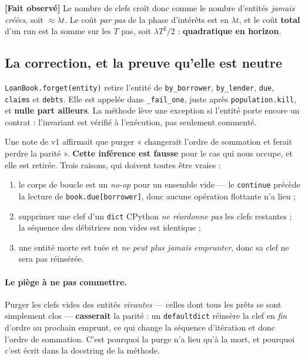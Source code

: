 \documentclass[11pt,a4paper]{article}
\newcommand{\code}[1]{\texttt{#1}}
\newcommand{\fait}{\textbf{[Fait observé]}}
\begin{document}
\fait{} Le nombre de clefs croît donc comme le nombre d'entités \emph{jamais
créées}, soit $\approx \lambda t$. Le coût \emph{par pas} de la phase
d'intérêts est en $\lambda t$, et le coût \textbf{total} d'un run est la somme
sur les $T$ pas, soit $\lambda T^2/2$ : \textbf{quadratique en horizon}.

\subsection{La correction, et la preuve qu'elle est neutre}

\code{LoanBook.forget(entity)} retire l'entité de \code{by\_borrower},
\code{by\_lender}, \code{due}, \code{claims} et \code{debts}. Elle est appelée
dans \code{\_fail\_one}, juste après \code{population.kill}, et \textbf{nulle
part ailleurs}. La méthode lève une exception si l'entité porte encore un
contrat : l'invariant est vérifié à l'exécution, pas seulement commenté.

Une note de v1 affirmait que purger « changerait l'ordre de sommation et ferait
perdre la parité ». \textbf{Cette inférence est fausse} pour le cas qui nous
occupe, et elle est retirée. Trois raisons, qui doivent toutes être vraies :

\begin{enumerate}
\item le corps de boucle est un \emph{no-op} pour un ensemble vide --- le
  \code{continue} précède la lecture de \code{book.due[borrower]}, donc aucune
  opération flottante n'a lieu ;
\item supprimer une clef d'un \code{dict} CPython \emph{ne réordonne pas} les
  clefs restantes ; la séquence des débitrices non vides est identique ;
\item une entité morte est tuée et \emph{ne peut plus jamais emprunter}, donc
  sa clef ne sera pas réinsérée.
\end{enumerate}

\paragraph{Le piège à ne pas commettre.} Purger les clefs vides des entités
\emph{vivantes} --- celles dont tous les prêts se sont simplement clos ---
\textbf{casserait} la parité : un \code{defaultdict} réinsère la clef en
\emph{fin} d'ordre au prochain emprunt, ce qui change la séquence d'itération
et donc l'ordre de sommation. C'est pourquoi la purge n'a lieu qu'à la mort, et
pourquoi c'est écrit dans la docstring de la méthode.
\end{document}
